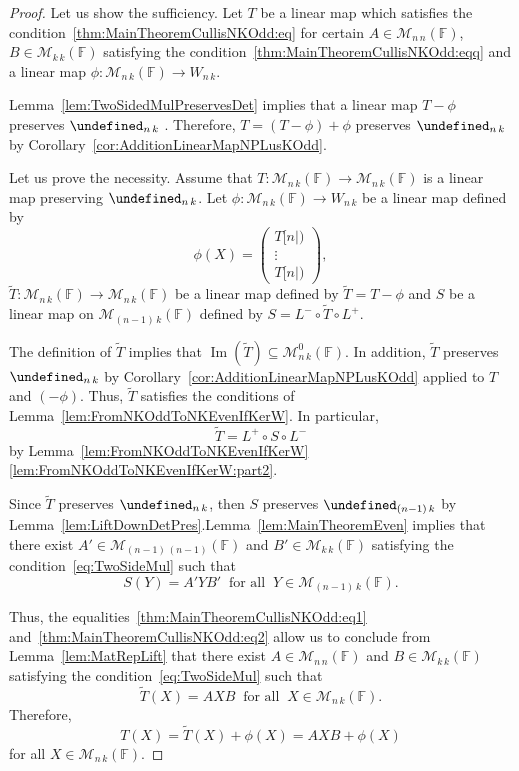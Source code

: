 \documentclass{elsarticle}
\DeclareMathOperator{\Img}{Im}
\def\F{{\mathbb F}}
\def\M{{\mathcal M}}
\let\det\undefined
\DeclareMathOperator{\det}{det}
\theoremstyle{plain}
\theoremstyle{definition}
\numberwithin{equation}{section}
\begin{document}
\begin{proof}
Let us show the sufficiency. Let $T$ be a linear map which satisfies the condition~\eqref{thm:MainTheoremCullisNKOdd:eq} for certain $A \in \M_{n\, n}(\F)$, $B \in \M_{k\, k}(\F)$ satisfying the condition~\eqref{thm:MainTheoremCullisNKOdd:eqq} and a linear map $\phi\colon \M_{n\,k}(\F) \to W_{n\,k}$. 

Lemma~\ref{lem:TwoSidedMulPreservesDet} implies that a linear map $T - \phi$ preserves $\det_{n\,k}$ . Therefore, $T = \left(T - \phi\right) + \phi$ preserves $\det_{n\,k}$ by Corollary~\ref{cor:AdditionLinearMapNPLusKOdd}. 

Let us prove the necessity. Assume that $T\colon \M_{n\,k} (\F) \to \M_{n\,k} (\F)$ is a linear map preserving $\det_{n\, k}$. Let $\phi\colon \M_{n\,k}(\F) \to W_{n\,k}$ be a linear map defined by
\[
\phi(X) = \begin{pmatrix}T[n|)\\\vdots\\ T[n|)\end{pmatrix},
\]
$\tilde{T}\colon \M_{n\,k} (\F) \to \M_{n\,k} (\F)$ be a linear map defined by $\tilde{T} = T - \phi$ and $S$ be a linear map on $\M_{(n-1)\,k}(\F)$  defined by $S = L^{-}\circ \tilde{T} \circ L^{+}$. 

The definition of $\tilde{T}$ implies that $\Img(\tilde{T}) \subseteq \M^{0}_{n\,k}(\F)$. In addition, $\tilde{T}$ preserves $\det_{n\,k}$ by Corollary~\ref{cor:AdditionLinearMapNPLusKOdd} applied to $T$ and $(-\phi)$. Thus, $\tilde{T}$ satisfies the conditions of Lemma~\ref{lem:FromNKOddToNKEvenIfKerW}. In particular, 
\begin{equation}\label{thm:MainTheoremCullisNKOdd:eq1}
\tilde{T} = L^{+}\circ S \circ L^{-}
\end{equation}
 by Lemma~\ref{lem:FromNKOddToNKEvenIfKerW}\ref{lem:FromNKOddToNKEvenIfKerW:part2}.

Since $\tilde{T}$ preserves $\det_{n\,k}$, then $S$ preserves $\det_{(n-1)\,k}$ by Lemma~\ref{lem:LiftDownDetPres}.\linebreak Lemma~\ref{lem:MainTheoremEven} implies that there exist $A' \in \M_{(n-1)\,(n-1)}(\F)$ and $B' \in \M_{k\,k}(\F)$ satisfying the condition~\eqref{eq:TwoSideMul} such that 
\begin{equation}\label{thm:MainTheoremCullisNKOdd:eq2}
S(Y) = A'YB'\;\;\mbox{for all}\;\; Y \in \M_{(n-1)\,k}(\F).
\end{equation}

Thus, the equalities~\eqref{thm:MainTheoremCullisNKOdd:eq1} and~\eqref{thm:MainTheoremCullisNKOdd:eq2} allow us to conclude from Lemma~\ref{lem:MatRepLift} that there exist $A \in \M_{n\, n}(\F)$ and $B \in \M_{k\, k}(\F)$ satisfying the condition~\eqref{eq:TwoSideMul} such that 
$$\tilde{T}(X) = AXB\;\;\mbox{for all}\;\; X \in \M_{n\,k}(\F).$$
Therefore,
\[
T(X) = \tilde{T}(X) + \phi(X) = AXB + \phi(X)
\]
for all $X \in \M_{n\,k} (\F).$
\end{proof}
\end{document}
